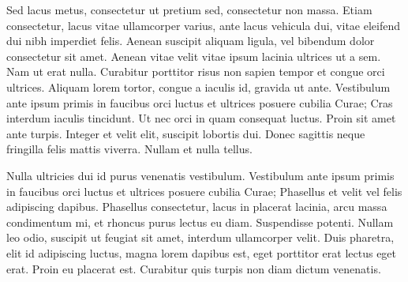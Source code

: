 Sed lacus metus, consectetur ut pretium sed, consectetur non massa. Etiam consectetur, lacus vitae ullamcorper varius, ante lacus vehicula dui, vitae eleifend dui nibh imperdiet felis. Aenean suscipit aliquam ligula, vel bibendum dolor consectetur sit amet. Aenean vitae velit vitae ipsum lacinia ultrices ut a sem. Nam ut erat nulla. Curabitur porttitor risus non sapien tempor et congue orci ultrices. Aliquam lorem tortor, congue a iaculis id, gravida ut ante. Vestibulum ante ipsum primis in faucibus orci luctus et ultrices posuere cubilia Curae; Cras interdum iaculis tincidunt. Ut nec orci in quam consequat luctus. Proin sit amet ante turpis. Integer et velit elit, suscipit lobortis dui. Donec sagittis neque fringilla felis mattis viverra. Nullam et nulla tellus.

Nulla ultricies dui id purus venenatis vestibulum. Vestibulum ante ipsum primis in faucibus orci luctus et ultrices posuere cubilia Curae; Phasellus et velit vel felis adipiscing dapibus. Phasellus consectetur, lacus in placerat lacinia, arcu massa condimentum mi, et rhoncus purus lectus eu diam. Suspendisse potenti. Nullam leo odio, suscipit ut feugiat sit amet, interdum ullamcorper velit. Duis pharetra, elit id adipiscing luctus, magna lorem dapibus est, eget porttitor erat lectus eget erat. Proin eu placerat est. Curabitur quis turpis non diam dictum venenatis. 